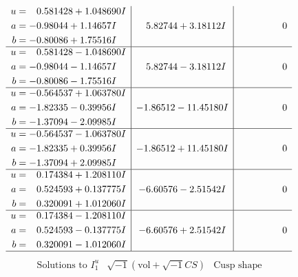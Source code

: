 \documentclass[1p]{elsarticle_modified}
\theoremstyle{definition}
\newcommand{\I}{\sqrt{-1}}
\begin{document}
$$\begin{array}{c|c|c}
\begin{aligned}
u &= \phantom{-}0.581428 + 1.048690 I \\
a &= -0.98044 + 1.14657 I \\
b &= -0.80086 + 1.75516 I\end{aligned}
 & \phantom{-}5.82744 + 3.18112 I & \phantom{-0.000000 } 0 \\ \hline\begin{aligned}
u &= \phantom{-}0.581428 - 1.048690 I \\
a &= -0.98044 - 1.14657 I \\
b &= -0.80086 - 1.75516 I\end{aligned}
 & \phantom{-}5.82744 - 3.18112 I & \phantom{-0.000000 } 0 \\ \hline\begin{aligned}
u &= -0.564537 + 1.063780 I \\
a &= -1.82335 - 0.39956 I \\
b &= -1.37094 - 2.09985 I\end{aligned}
 & -1.86512 - 11.45180 I & \phantom{-0.000000 } 0 \\ \hline\begin{aligned}
u &= -0.564537 - 1.063780 I \\
a &= -1.82335 + 0.39956 I \\
b &= -1.37094 + 2.09985 I\end{aligned}
 & -1.86512 + 11.45180 I & \phantom{-0.000000 } 0 \\ \hline\begin{aligned}
u &= \phantom{-}0.174384 + 1.208110 I \\
a &= \phantom{-}0.524593 + 0.137775 I \\
b &= \phantom{-}0.320091 + 1.012060 I\end{aligned}
 & -6.60576 - 2.51542 I & \phantom{-0.000000 } 0 \\ \hline\begin{aligned}
u &= \phantom{-}0.174384 - 1.208110 I \\
a &= \phantom{-}0.524593 - 0.137775 I \\
b &= \phantom{-}0.320091 - 1.012060 I\end{aligned}
 & -6.60576 + 2.51542 I & \phantom{-0.000000 } 0\\
 \hline 
 \end{array}$$\newpage$$\begin{array}{c|c|c}  
\text{Solutions to }I^u_{1}& \I (\text{vol} + \sqrt{-1}CS) & \text{Cusp shape}\\
 \hline 
\begin{aligned}

\end{aligned}
\end{array}$$
\end{document}
